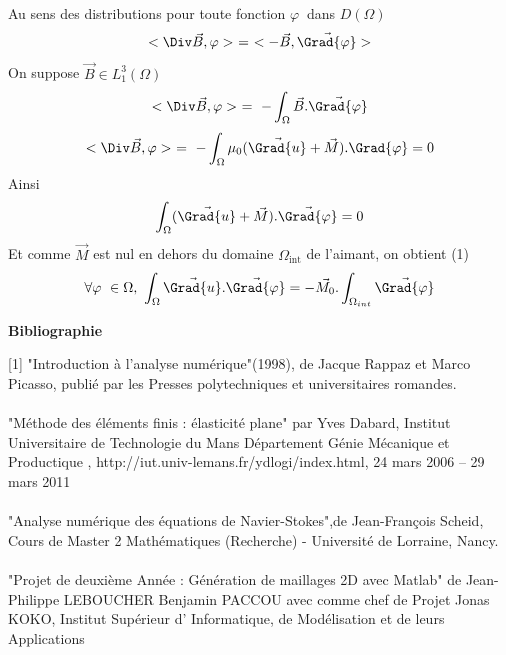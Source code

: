 \documentclass[a4paper,12pt,titlepage]{report}
\begin{document}
\begin{onehalfspace}
\begin{appendix}
	Au sens des distributions pour toute fonction $\varphi\ $  dans $D(\Omega)$	
	\[<\Div\vec{B},\varphi> \ = \ <-\vec{B},\vec{\Grad{\varphi}}>\]
	On suppose $\vec{B} \in L^{3}_{1}(\Omega)$
	\[<\Div\vec{B},\varphi> \ = \  -\int_{\Omega}\vec{B}. \vec{\Grad{\varphi}}\]
	\[<\Div\vec{B},\varphi> \ = \ -\int_{\Omega}\mu_{0}(\vec{\Grad{u}}+\vec{M}) .{\Grad{\varphi}} = 0\]
	Ainsi
	\[\int_{\Omega}(\vec{\Grad{u}}+\vec{M}) . \vec{\Grad{\varphi}} = 0\]
	Et comme $\vec{M}$ est nul en dehors du domaine $\Omega_{\text{int}}$ de l'aimant, on obtient (1)
	\[
		\forall \varphi\ \in \Omega, \ \int_{\Omega}\vec{\Grad{u}}.\vec{\Grad{\varphi}} = -\vec{M_{0}}. \int_{\Omega_{int}}\vec{\Grad{\varphi}}
	\]
\fi

\end{appendix}
\end{onehalfspace}

\newpage
\normalsize \bf Bibliographie




 [1] "Introduction à l'analyse numérique"(1998), de Jacque Rappaz et Marco Picasso, publié par les Presses polytechniques et universitaires romandes.
\\
\\
[2] "Méthode des éléments finis : élasticité plane" par Yves Dabard, Institut Universitaire de Technologie du Mans Département Génie Mécanique et Productique
, http://iut.univ-lemans.fr/ydlogi/index.html, 24 mars 2006 – 29 mars 2011
%
%
\\
\\
[3] "Analyse numérique des équations de Navier-Stokes",de Jean-François Scheid,  Cours de Master 2 Mathématiques (Recherche) - Université de Lorraine, Nancy.
\\
\\
[4] "Projet de deuxième Année : Génération de maillages 2D avec Matlab" de Jean-Philippe LEBOUCHER Benjamin PACCOU avec comme chef de Projet Jonas KOKO, Institut
Supérieur d’ Informatique, de Modélisation et de leurs Applications
\end{document}
